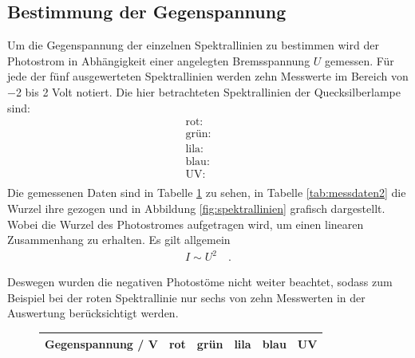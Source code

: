 \subsection{Bestimmung der Gegenspannung}
\label{sec:gegenspannung}
Um die Gegenspannung der einzelnen Spektrallinien zu bestimmen wird der Photostrom in Abhängigkeit einer angelegten Bremsspannung $U$ gemessen. Für jede der fünf ausgewerteten Spektrallinien werden zehn Messwerte im Bereich von  \num{-2} bis \num{2} Volt notiert.
Die hier betrachteten Spektrallinien der Quecksilberlampe sind:
\begin{align*}
	\text{rot:} \quad &  \\
	\text{grün:} \quad &  \\
	\text{lila:} \quad &  \\
	\text{blau:} \quad &  \\
	\text{UV:} \quad &  \\
\end{align*}
Die gemessenen Daten sind in Tabelle \ref{tab:messdaten1}  zu sehen, in Tabelle \ref{tab:messdaten2} die Wurzel ihre gezogen und in Abbildung \ref{fig:spektrallinien} grafisch dargestellt. Wobei die Wurzel des Photostromes aufgetragen wird, um einen linearen Zusammenhang zu erhalten. Es gilt allgemein
\begin{align}
	I \sim U^2 \quad .
\end{align}

Deswegen wurden die negativen Photostöme nicht weiter beachtet, sodass zum Beispiel bei der roten Spektrallinie nur sechs von zehn Messwerten in der Auswertung berücksichtigt werden. \\
\begin{figure}[h!]
	\centering
	\begin{tabular}{c|ccccc}
		Gegenspannung / V & rot & grün & lila & blau & UV \\
		\hline
		
	\end{tabular}
	\label{tab:messdaten1}
\end{figure}

